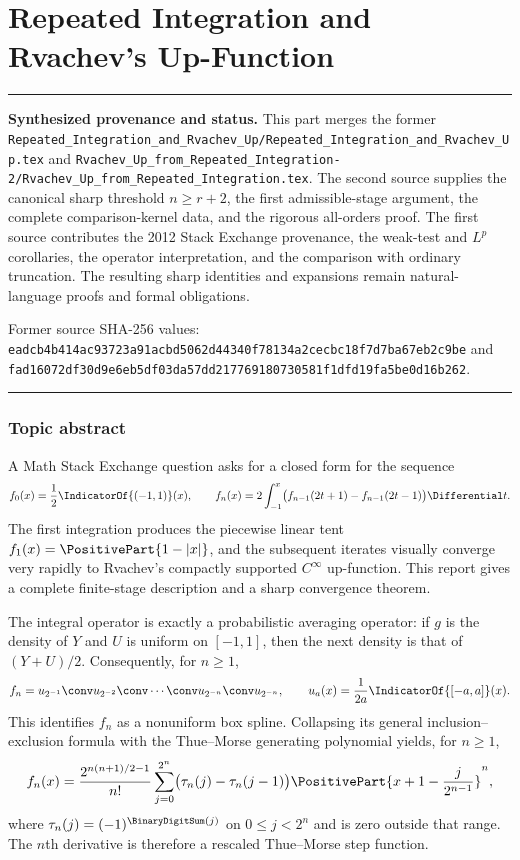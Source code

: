 \documentclass[11pt,oneside]{article}
\theoremstyle{definition}
\theoremstyle{remark}
\newenvironment{boxedremark}{%
  \par\smallskip\noindent\begin{center}\begin{minipage}{0.94\textwidth}%
  \color{black}\hrule\vspace{0.6em}\small
}{%
  \vspace{0.6em}\hrule\end{minipage}\end{center}\smallskip
}
\begin{document}
\part{Repeated Integration and Rvachev's Up-Function}
\label{part:repeated2}
\begin{boxedremark}
\textbf{Synthesized provenance and status.} This part merges the former
\nolinkurl{Repeated_Integration_and_Rvachev_Up/Repeated_Integration_and_Rvachev_Up.tex}
and
\nolinkurl{Rvachev_Up_from_Repeated_Integration-2/Rvachev_Up_from_Repeated_Integration.tex}.
The second source supplies the canonical sharp threshold \(n\ge r+2\), the first
admissible-stage argument, the complete comparison-kernel data, and the rigorous
all-orders proof.  The first source contributes the 2012 Stack Exchange provenance,
the weak-test and \(L^p\) corollaries, the operator interpretation, and the comparison
with ordinary truncation.  The resulting sharp identities and expansions remain
natural-language proofs and formal obligations.\par\smallskip
Former source SHA-256 values:
\nolinkurl{eadcb4b414ac93723a91acbd5062d44340f78134a2cecbc18f7d7ba67eb2c9be} and
\nolinkurl{fad16072df30d9e6eb5df03da57dd217769180730581f1dfd19fa5be0d16b262}.
\end{boxedremark}
\section*{Topic abstract}
A Math Stack Exchange question asks for a closed form for the sequence
\[
 f_0(x)=\frac12\IndicatorOf{(-1,1)}(x),\qquad
 f_n(x)=2\int_{-1}^{x}\bigl(f_{n-1}(2t+1)-f_{n-1}(2t-1)\bigr)\Differential t.
\]
The first integration produces the piecewise linear tent
$f_1(x)=\PositivePart{1-|x|}$, and the subsequent iterates visually converge very rapidly to
Rvachev's compactly supported $C^\infty$ up-function.  This report gives a complete
finite-stage description and a sharp convergence theorem.

The integral operator is exactly a probabilistic averaging operator: if $g$ is the density
of $Y$ and $U$ is uniform on $[-1,1]$, then the next density is that of $(Y+U)/2$.
Consequently, for $n\ge1$,
\[
 f_n=u_{2^{-1}}\conv u_{2^{-2}}\conv\cdots\conv u_{2^{-n}}\conv u_{2^{-n}},
 \qquad
 u_a(x)=\frac1{2a}\IndicatorOf{[-a,a]}(x).
\]
This identifies $f_n$ as a nonuniform box spline.  Collapsing its general
inclusion--exclusion formula with the Thue--Morse generating polynomial yields, for
$n\ge1$,
\[
 f_n(x)=\frac{2^{n(n+1)/2-1}}{n!}
 \sum_{j=0}^{2^n}\bigl(\tau_n(j)-\tau_n(j-1)\bigr)
 \PositivePart{x+1-\frac{j}{2^{n-1}}}^{n},
\]
where $\tau_n(j)=(-1)^{\BinaryDigitSum(j)}$ on $0\le j<2^n$ and is zero outside that range.
The $n$th derivative is therefore a rescaled Thue--Morse step function.
\end{document}
